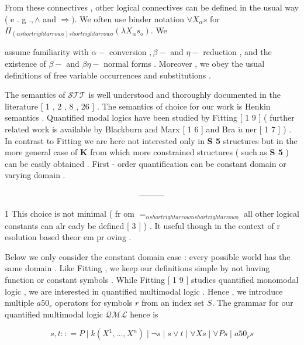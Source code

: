 \documentclass[10pt]{article}
\begin{document}
\noindent From these connectives , other logical connectives can be defined in the usual way 
 ( e . g  $ .  ,   \wedge $  and  $ \Rightarrow  )  . $  We often use binder notation  $ \forall  X _{ \alpha }  s $  for  $ \Pi _{ (  \alpha  shortrightarrow  o  )  shortrightarrow  o } (  \lambda  X _{ \alpha }  s _{ o } )  . $  We 

\noindent assume familiarity with  $ \alpha  - $  conversion  $ ,   \beta  - $  and  $ \eta  - $  reduction , and the existence of 
  $ \beta  - $  and  $ \beta  \eta  - $  normal forms . Moreover , we obey the usual definitions of free variable 
 occurrences and substitutions . 

The semantics of  $ \mathcal{STT} $  is well understood and thoroughly documented in the 
 literature [ 1 , 2 , 8 , 26 ] . The semantics of choice for our work is Henkin semantics . 
 Quantified modal logics have been studied by Fitting [ 1 9 ] \quad ( further related 
 work is available by Blackburn and Marx [ 1 6 ] and Bra  $ \ddot{u} $  ner [ 1 7 ] ) . In contrast to 
 Fitting we are here not interested only in \textbf{S 5 } structures but in the more general 
 case of \textbf{K } from which more constrained structures ( such as \textbf{S 5 } ) can be easily 
 obtained . First - order quantification can be constant domain or varying domain . 

\begin{align*}
 \rule{3em}{0.4pt} 
\end{align*}

{\scriptsize 1 } {\small This choice is not minimal ( fr om }  $ = _{ \alpha  shortrightarrow  \alpha  shortrightarrow  o }$  {\small all other logical constants can alr eady be } 
 {\small defined [ 3 ] ) . It useful though in the context of r esolution based theor em pr oving . } 


\newpage
\noindent Below we only consider the constant domain case : every possible world has the 
 same domain . Like Fitting , we keep our definitions simple by not having function 
 or constant symbols . While Fitting [ 1 9 ] studies quantified monomodal logic , we 
 are interested in quantified multimodal logic . Hence , we introduce multiple  $ a50 _{ r }$  
 operators for symbols  $ r $  from an index set  $ S  . $  The grammar for our quantified 
 multimodal logic  $ \mathcal{QML} $  hence is 

\[ s  ,   t   :  :  =   P   \mid   k  (  X ^{ 1 } ,   .   .   .   ,   X ^{ n } )   \mid   \neg   s   \mid   s   \vee   t   \mid   \forall  X   s   \mid   \forall  P   s   \mid   a50 _{ r }  s \]
\end{document}
